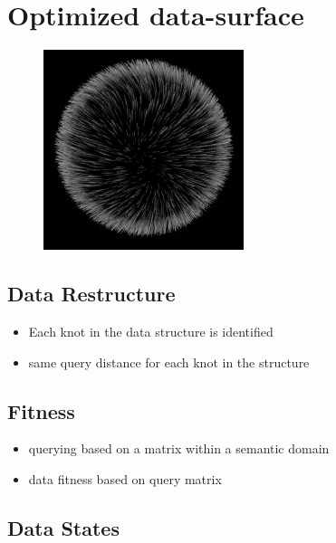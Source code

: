 \documentclass[11pt]{article}
\begin{document}
\section{Optimized data-surface}
\begin{figure}[htp]
\centering
\includegraphics[scale=0.59]{./image/query-surface.jpg}
\end{figure}
\subsection{Data Restructure}

\begin{itemize}
\item Each knot in the data structure is identified
\item same query distance for each knot in the structure
\end{itemize}
\subsection{Fitness}


\begin{itemize}
\item querying based on a matrix within a semantic domain
\item data fitness based on query matrix


\end{itemize}

\subsection{Data States}
\end{document}
